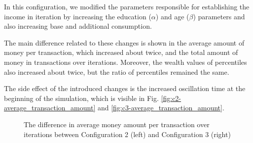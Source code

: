 \documentclass[english]{projectreport}
\begin{document}
    In this configuration, we modified the parameters responsible for establishing the income in iteration by increasing the education ($\alpha$) and age ($\beta$) parameters and also increasing base and additional consumption.

    The main difference related to these changes is shown in the average amount of money per transaction, which increased about twice, and the total amount of money in transactions over iterations. Moreover, the wealth values of percentiles also increased about twice, but the ratio of percentiles remained the same.

    The side effect of the introduced changes is the increased oscillation time at the beginning of the simulation, which is visible in Fig. \ref{fig:c2-average_transaction_amount} and \ref{fig:c3-average_transaction_amount}.

\begin{figure}[H]
\begin{center}
%
\end{center}
\caption{The difference in average money amount per transaction over iterations between Configuration 2 (left) and Configuration 3 (right)}
\end{figure}
\end{document}
